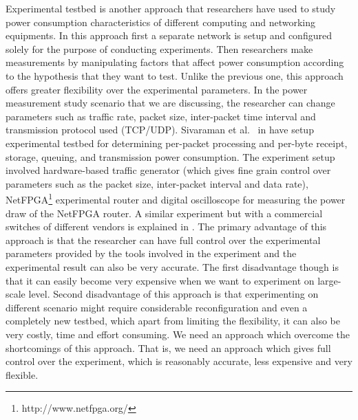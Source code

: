 Experimental testbed is another approach that researchers have used to study power consumption characteristics of different computing and networking equipments. In this approach first a separate network is setup and configured solely for the purpose of conducting experiments. Then researchers make measurements by manipulating factors that affect power consumption according to the hypothesis that they want to test. Unlike the previous one, this approach offers greater flexibility over the experimental parameters. In the power measurement study scenario that we are discussing, the researcher can change parameters such as traffic rate, packet size, inter-packet time interval and transmission protocol used (TCP/UDP). Sivaraman et al.{\ } in \cite{Sivaraman} have setup experimental testbed for determining per-packet processing and per-byte receipt, storage, queuing, and transmission power consumption. The experiment setup involved hardware-based traffic generator (which gives fine grain control over parameters such as the packet size, inter-packet interval and data rate), NetFPGA\footnote{http://www.netfpga.org/} experimental router and digital oscilloscope for measuring the power draw of the NetFPGA router. A similar experiment but with a commercial switches of different vendors is explained in \cite{DBLP:journals/comcom/SivaramanRZSVMR14}. The primary advantage of this approach is that the researcher can have full control over the experimental parameters provided by the tools involved in the experiment and the experimental result can also be very accurate. The first disadvantage though is that it can easily become very expensive when we want to experiment on large-scale level. Second disadvantage of this approach is that experimenting on different scenario might require considerable reconfiguration and even a completely new testbed, which apart from limiting the flexibility, it can also be very costly, time and effort consuming. We need an approach which overcome the shortcomings of this approach. That is, we need an approach which gives full control over the experiment, which is reasonably accurate, less expensive and very flexible. 

